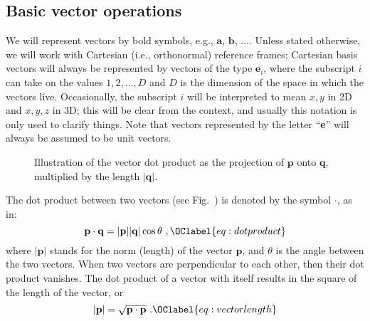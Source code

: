 \subsection{Basic vector operations}
We will represent vectors by bold symbols, e.g.,  $\mathbf{a}$, $\mathbf{b}$, $\ldots$.  Unless stated otherwise, we will work with Cartesian (i.e., orthonormal) reference frames; Cartesian basis vectors will always be represented by vectors of the type $\mathbf{e}_i$, where the subscript $i$ can take on the values $1, 2, \ldots, D$ and $D$ is the dimension of the space in which the vectors live.  Occasionally, the subscript $i$ will be interpreted to mean $x, y$ in 2D and $x,y,z$ in 3D; this will be clear from the context, and usually this notation is only used to clarify things.  Note that vectors represented by the letter ``\textbf{e}'' will always be assumed to be unit vectors.

\begin{wrapfigure}{r}{0.3\textwidth}
  \centering\leavevmode
{}
\caption{\small Illustration of the vector dot product as the projection of $\mathbf{p}$ onto $\mathbf{q}$, multiplied by the length $\vert\mathbf{q}\vert$.}
\end{wrapfigure}

The dot product between two vectors (see Fig.~) is denoted by the symbol $\cdot$, as in:
\begin{equation}
	\mathbf{p}\cdot\mathbf{q} = \vert\mathbf{p}\vert\vert\mathbf{q}\vert\cos\theta \ ,\OClabel{eq:dotproduct}
\end{equation}
where $\vert\mathbf{p}\vert$ stands for the norm (length) of the vector $\mathbf{p}$, and $\theta$ is the angle between the two vectors. When two vectors are perpendicular to each other, then their dot product vanishes.  The dot product of a vector with itself results in the square of the length of the vector, or
\begin{equation}
	\vert\mathbf{p}\vert = \sqrt{\mathbf{p}\cdot\mathbf{p}} \ .\OClabel{eq:vectorlength}
\end{equation}

